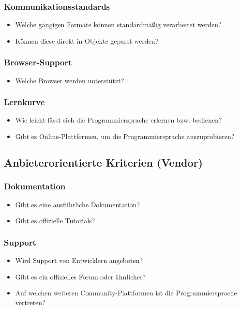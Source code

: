 \subsubsection{Kommunikationsstandards}
\begin{itemize}
	\item Welche gängigen Formate können standardmäßig verarbeitet werden?
	\item Können diese direkt in Objekte geparst werden?
\end{itemize}

\subsubsection{Browser-Support}
\begin{itemize}
	\item Welche Browser werden unterstützt?
\end{itemize}

\subsubsection{Lernkurve}
\begin{itemize}
	\item Wie leicht lässt sich die Programmiersprache erlernen bzw. bedienen?
	\item Gibt es Online-Plattformen, um die Programmiersprache auszuprobieren?
\end{itemize}
 
\subsection{Anbieterorientierte Kriterien (Vendor)}\label{sec:vendorCriteria}
\subsubsection{Dokumentation}
\begin{itemize}
	\item Gibt es eine ausführliche Dokumentation?
	\item Gibt es offizielle Tutorials?
\end{itemize}

\subsubsection{Support}
\begin{itemize}
	\item Wird Support von Entwicklern angeboten?
	\item Gibt es ein offizielles Forum oder ähnliches?
	\item Auf welchen weiteren Community-Plattformen ist die Programmiersprache vertreten? 
\end{itemize}

